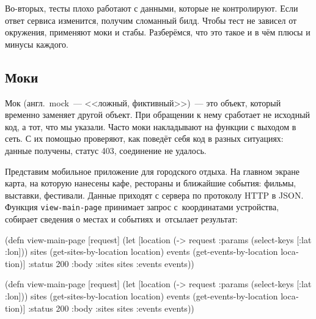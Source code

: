 Во-вторых, тесты плохо работают с данными, которые не контролируют. Если ответ
сервиса изменится, получим сломанный билд. Чтобы тест не зависел от окружения,
применяют моки и стабы. Разберёмся, что это такое и в чём плюсы и минусы
каждого.

\subsection{Моки}

\label{test-isolation}


Мок (англ.~mock~--- <<ложный, фиктивный>>)~--- это объект, который временно
заменяет другой объект. При обращении к нему сработает не исходный код, а тот,
что мы указали. Часто моки накладывают на функции с выходом в сеть. С их помощью
проверяют, как поведёт себя код в разных ситуациях: данные получены, статус 403,
соединение не удалось.

\label{mobile-app-intro}


Представим мобильное приложение для городского отдыха. На главном экране карта,
на которую нанесены кафе, рестораны и ближайшие события: фильмы, выставки,
фестивали. Данные приходят с сервера по протоколу HTTP в JSON. Функция
\verb|view-main-page| принимает запрос с~координатами устройства, собирает
сведения о местах и событиях и~отсылает результат:

\ifx\DEVICETYPE\MOBILE

\begin{english}
  \begin{clojure}
(defn view-main-page [request]
  (let [location
        (-> request
            :params
            (select-keys [:lat :lon]))
        sites
        (get-sites-by-location location)
        events
        (get-events-by-location
          location)]
    {:status 200
     :body {:sites sites
            :events events}}))
  \end{clojure}
\end{english}

\else

\begin{english}
  \begin{clojure}
(defn view-main-page [request]
  (let [location (-> request :params (select-keys [:lat :lon]))
        sites (get-sites-by-location location)
        events (get-events-by-location location)]
    {:status 200
     :body {:sites sites :events events}}))
  \end{clojure}
\end{english}

